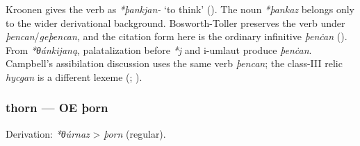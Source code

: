 \documentclass[
  british,
  a4paper,
]{article}
\begin{document}
Kroonen gives the verb as \emph{*þankjan-} `to think'
(). The noun \emph{*þankaz}
belongs only to the wider derivational background. Bosworth-Toller
preserves the verb under \emph{þencan}/\emph{geþencan}, and the citation
form here is the ordinary infinitive \emph{þenċan}
(). From
\emph{*θánkijaną}, palatalization before \emph{*j} and i-umlaut produce
\emph{þenċan}. Campbell's assibilation discussion uses the same verb
\emph{þencan}; the class-III relic \emph{hycgan} is a different lexeme
(;
).

\subsubsection{thorn --- OE þorn}\label{thorn-oe-uxfeorn}

Derivation: \emph{*θúrnaz} \textgreater{} \emph{þorn} (regular).

\begingroup
\setlength{\fboxsep}{6pt}
\end{document}
